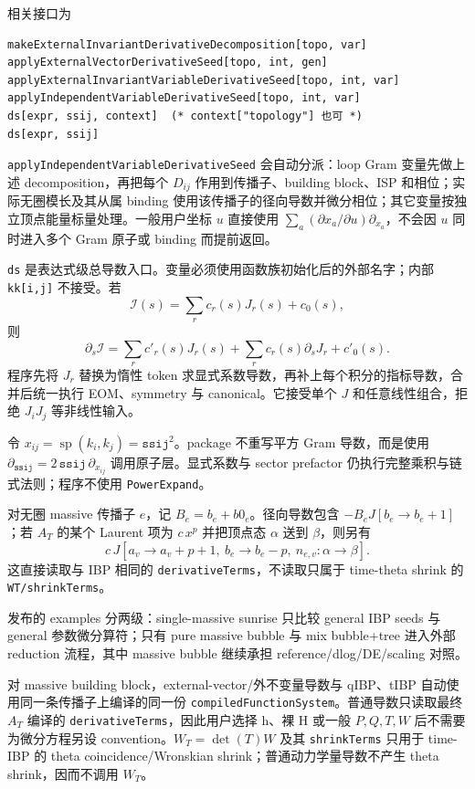 ﻿\documentclass[a4paper,11pt]{article}
\begin{document}
相关接口为
\begin{verbatim}
makeExternalInvariantDerivativeDecomposition[topo, var]
applyExternalVectorDerivativeSeed[topo, int, gen]
applyExternalInvariantVariableDerivativeSeed[topo, int, var]
applyIndependentVariableDerivativeSeed[topo, int, var]
ds[expr, ssij, context]  (* context["topology"] 也可 *)
ds[expr, ssij]
\end{verbatim}
\texttt{applyIndependentVariableDerivativeSeed} 会自动分派：loop Gram 变量先做上述 decomposition，再把每个 $D_{ij}$ 作用到传播子、building block、ISP 和相位；实际无圈模长及其从属 binding 使用该传播子的径向导数并微分相位；其它变量按独立顶点能量标量处理。一般用户坐标 $u$ 直接使用 $\sum_a(\partial x_a/\partial u)\partial_{x_a}$，不会因 $u$ 同时进入多个 Gram 原子或 binding 而提前返回。

\texttt{ds} 是表达式级总导数入口。变量必须使用函数族初始化后的外部名字；内部 \texttt{kk[i,j]} 不接受。若
\begin{equation}
 \mathcal I(s)=\sum_r c_r(s)J_r(s)+c_0(s),
\end{equation}
则
\begin{equation}
 \partial_s\mathcal I
 =\sum_r c'_r(s)J_r(s)+\sum_r c_r(s)\partial_sJ_r+c'_0(s).
\end{equation}
程序先将 $J_r$ 替换为惰性 token 求显式系数导数，再补上每个积分的指标导数，合并后统一执行 EOM、symmetry 与 canonical。它接受单个 $J$ 和任意线性组合，拒绝 $J_iJ_j$ 等非线性输入。

令 $x_{ij}=\operatorname{sp}(k_i,k_j)=\texttt{ssij}^2$。package 不重写平方 Gram 导数，而是使用 $\partial_{\texttt{ssij}}=2\,\texttt{ssij}\,\partial_{x_{ij}}$ 调用原子层。显式系数与 sector prefactor 仍执行完整乘积与链式法则；程序不使用 \texttt{PowerExpand}。

对无圈 massive 传播子 $e$，记 $B_e=b_e+b0_e$。径向导数包含 $-B_eJ[b_e\to b_e+1]$；若 $A_T$ 的某个 Laurent 项为 $c\,x^p$ 并把顶点态 $\alpha$ 送到 $\beta$，则另有
\begin{equation}
 c\,J[a_v\to a_v+p+1,\ b_e\to b_e-p,\ n_{e,v}:\alpha\to\beta].
\end{equation}
这直接读取与 IBP 相同的 \texttt{derivativeTerms}，不读取只属于 time-theta shrink 的 \texttt{WT/shrinkTerms}。

发布的 examples 分两级：single-massive sunrise 只比较 general IBP seeds 与 general 参数微分算符；只有 pure massive bubble 与 mix bubble+tree 进入外部 reduction 流程，其中 massive bubble 继续承担 reference/dlog/DE/scaling 对照。

对 massive building block，external-vector/外不变量导数与 qIBP、tIBP 自动使用同一条传播子上编译的同一份 \texttt{compiledFunctionSystem}。普通导数只读取最终 $A_T$ 编译的 \texttt{derivativeTerms}，因此用户选择 h、裸 H 或一般 $P,Q,T,W$ 后不需要为微分方程另设 convention。$W_T=\det(T)W$ 及其 \texttt{shrinkTerms} 只用于 time-IBP 的 theta coincidence/Wronskian shrink；普通动力学量导数不产生 theta shrink，因而不调用 $W_T$。
\end{document}
